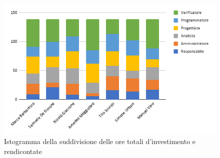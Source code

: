 \begin{figure}[!h]
    \vspace{5px}
    \includegraphics[scale=0.6]{../../../Images/Diagrammi/Istogrammi/ore totali.png}
    \centering
    \caption{Istogramma della suddivisione delle ore totali d'investimento e rendicontate}
\end{figure}

